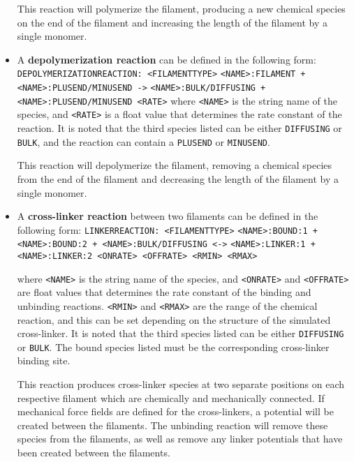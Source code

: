 \documentclass[11pt, oneside]{article}   	%
\begin{document}
\begin{itemize}
This reaction will polymerize the filament, producing a new chemical species on the end of the filament and increasing 
the length of the filament by a single monomer.

\item A \textbf{depolymerization reaction} can be defined in the following form:\newline\newline
\texttt{DEPOLYMERIZATIONREACTION: <FILAMENTTYPE>}\newline
\texttt{<NAME>:FILAMENT + <NAME>:PLUSEND/MINUSEND ->}\newline
\texttt{<NAME>:BULK/DIFFUSING + <NAME>:PLUSEND/MINUSEND <RATE>}\newline\newline
 where \texttt{<NAME>} is the string name of the species, and \texttt{<RATE>} is a float value that determines the rate constant of the reaction. It is noted that the third species listed can be either \texttt{DIFFUSING} or \texttt{BULK}, and the reaction can contain a \texttt{PLUSEND} or \texttt{MINUSEND}.
 
 This reaction will depolymerize the filament, removing a chemical species from the end of the filament and decreasing the length of the filament by a single monomer.

\item A \textbf{cross-linker reaction} between two filaments can be defined in the following form:\newline\newline
\texttt{LINKERREACTION: <FILAMENTTYPE>}\newline
\texttt{<NAME>:BOUND:1 + <NAME>:BOUND:2 + <NAME>:BULK/DIFFUSING <->}\newline
\texttt{<NAME>:LINKER:1 + <NAME>:LINKER:2 <ONRATE> <OFFRATE> <RMIN> <RMAX>}\newline

where \texttt{<NAME>} is the string name of the species, and \texttt{<ONRATE>} and \texttt{<OFFRATE>} are float values that determines the rate constant of the binding and unbinding reactions. \texttt{<RMIN>} and \texttt{<RMAX>} are the range of the chemical reaction, and this can be set depending on the structure of the simulated cross-linker. It is noted that the third species listed can be either \texttt{DIFFUSING} or \texttt{BULK}. The bound species listed must be the corresponding cross-linker binding site.

This reaction produces cross-linker species at two separate positions on each respective filament which are chemically and mechanically connected. If mechanical force fields are defined for the cross-linkers, a potential will be created between the filaments. The unbinding reaction will remove these species from the filaments, as well as remove any linker potentials that have been created between the filaments.


\end{itemize}
\end{document}
